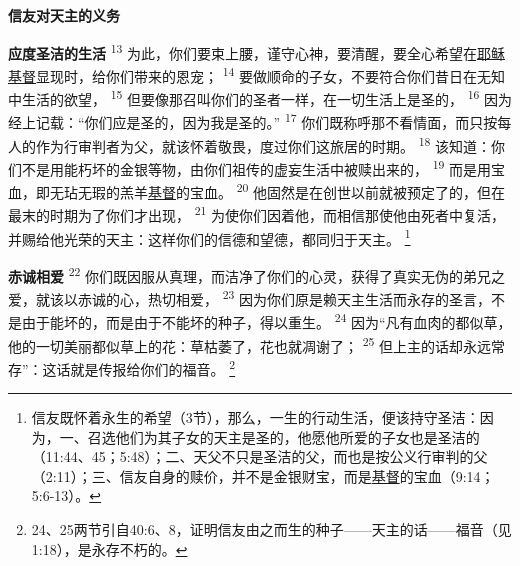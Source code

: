 \begin{center}
	\textbf{\large{\songti 信友对天主的义务}}
\end{center}

\textbf{应度圣洁的生活\quad}
\textsuperscript{13}
为此，你们要束上腰，谨守心神，要清醒，要全心希望在\uline{耶稣}\uline{基督}显现时，给你们带来的恩宠；
\textsuperscript{14}
要做顺命的子女，不要符合你们昔日在无知中生活的欲望，
\textsuperscript{15}
但要像那召叫你们的圣者一样，在一切生活上是圣的，
\textsuperscript{16}
因为经上记载：“你们应是圣的，因为我是圣的。”
\textsuperscript{17}
你们既称呼那不看情面，而只按每人的作为行审判者为父，就该怀着敬畏，度过你们这旅居的时期。
\textsuperscript{18}
该知道：你们不是用能朽坏的金银等物，由你们祖传的虚妄生活中被赎出来的，
\textsuperscript{19}
而是用宝血，即无玷无瑕的羔羊\uline{基督}的宝血。
\textsuperscript{20}
他固然是在创世以前就被预定了的，但在最末的时期为了你们才出现，
\textsuperscript{21}
为使你们因着他，而相信那使他由死者中复活，并赐给他光荣的天主：这样你们的信德和望德，都同归于天主。
\footnote{信友既怀着永生的希望（3节），那么，一生的行动生活，便该持守圣洁：因为，一、召选他们为其子女的天主是圣的，他愿他所爱的子女也是圣洁的（11:44、45；5:48）；二、天父不只是圣洁的父，而也是按公义行审判的父（2:11）；三、信友自身的赎价，并不是金银财宝，而是\uline{基督}的宝血（9:14；5:6-13）。}

\textbf{赤诚相爱\quad}
\textsuperscript{22}
你们既因服从真理，而洁净了你们的心灵，获得了真实无伪的弟兄之爱，就该以赤诚的心，热切相爱，
\textsuperscript{23}
因为你们原是赖天主生活而永存的圣言，不是由于能坏的，而是由于不能坏的种子，得以重生。
\textsuperscript{24}
因为“凡有血肉的都似草，他的一切美丽都似草上的花：草枯萎了，花也就凋谢了；
\textsuperscript{25}
但上主的话却永远常存”：这话就是传报给你们的福音。
\footnote{24、25两节引自40:6、8，证明信友由之而生的种子——天主的话——福音（见1:18），是永存不朽的。}

